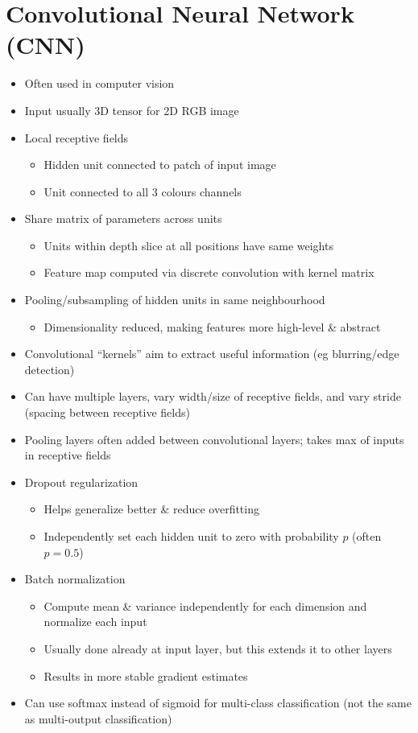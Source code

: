\documentclass[12pt]{article}
\begin{document}
\section{Convolutional Neural Network (CNN)}

\begin{itemize}
	\item Often used in computer vision
	\item Input usually 3D tensor for 2D RGB image
	\item Local receptive fields
	\begin{itemize}
		\item Hidden unit connected to patch of input image
		\item Unit connected to all 3 colours channels
	\end{itemize}
	\item Share matrix of parameters across units
	\begin{itemize}
		\item Units within depth slice at all positions have same weights 
		\item Feature map computed via discrete convolution with kernel matrix
	\end{itemize}
	\item Pooling/subsampling of hidden units in same neighbourhood
	\begin{itemize}
		\item Dimensionality reduced, making features more high-level \& abstract
	\end{itemize}
	\item Convolutional ``kernels'' aim to extract useful information (eg blurring/edge detection)
	\item Can have multiple layers, vary width/size of receptive fields, and vary stride (spacing between receptive fields)
	\item Pooling layers often added between convolutional layers; takes max of inputs in receptive fields
	\item Dropout regularization
	\begin{itemize}
		\item Helps generalize better \& reduce overfitting
		\item Independently set each hidden unit to zero with probability $p$ (often $p = 0.5$)
	\end{itemize}
	\item Batch normalization
	\begin{itemize}
		\item Compute mean \& variance independently for each dimension and normalize each input 
		\item Usually done already at input layer, but this extends it to other layers 
		\item Results in more stable gradient estimates
	\end{itemize}
	\item Can use softmax instead of sigmoid for multi-class classification (not the same as multi-output classification)
\end{itemize}
\end{document}
